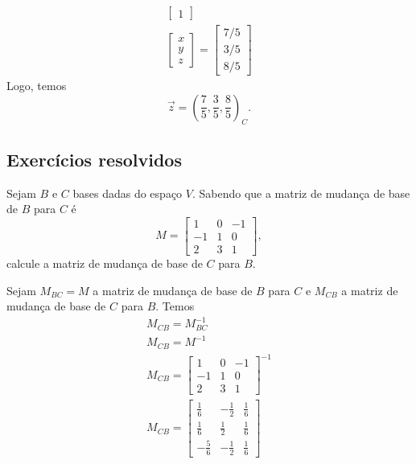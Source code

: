 \begin{ex}
\begin{gather}
\begin{bmatrix}
    1
  \end{bmatrix}\\
  \begin{bmatrix}
    x\\
    y\\
    z
  \end{bmatrix} =
    \begin{bmatrix}
    7/5\\
    3/5\\
    8/5
  \end{bmatrix}
\end{gather}
Logo, temos
\begin{equation}
  \vec{z} = \left(\frac{7}{5},\frac{3}{5},\frac{8}{5}\right)_C.
\end{equation}
\end{ex}

\subsection*{Exercícios resolvidos}

\begin{exeresol}\label{exeresol:cbsmb_mbccb}
  Sejam $B$ e $C$ bases dadas do espaço $V$. Sabendo que a matriz de mudança de base de $B$ para $C$ é
  \begin{equation}
    M =
    \begin{bmatrix}
      1 & 0 & -1 \\
      -1 & 1 & 0 \\
      2 & 3 & 1
    \end{bmatrix},
  \end{equation}
  calcule a matriz de mudança de base de $C$ para $B$.
\end{exeresol}
\begin{resol}
  Sejam $M_{BC}=M$ a matriz de mudança de base de $B$ para $C$ e $M_{CB}$ a matriz de mudança de base de $C$ para $B$. Temos
  \begin{gather}
    M_{CB} = M_{BC}^{-1}\\
    M_{CB} = M^{-1}\\
    M_{CB} =
    \begin{bmatrix}
      1 & 0 & -1 \\
      -1 & 1 & 0 \\
      2 & 3 & 1      
    \end{bmatrix}^{-1}\\
    M_{CB} =
    \begin{bmatrix}
      \frac{1}{6} & - \frac{1}{2} & \frac{1}{6}\\
      \frac{1}{6} & \frac{1}{2} & \frac{1}{6}\\
      - \frac{5}{6} & - \frac{1}{2} & \frac{1}{6}
    \end{bmatrix}
  \end{gather}
\end{resol}

